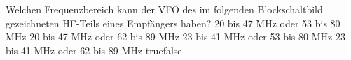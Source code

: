     {Welchen Frequenzbereich kann der VFO des im folgenden Blockschaltbild gezeichneten HF-Teils eines Empfängers haben?}
    {20 bis 47 MHz oder 53 bis 80 MHz}
    {20 bis 47 MHz oder 62 bis 89 MHz}
    {23 bis 41 MHz oder 53 bis 80 MHz}
    {23 bis 41 MHz oder 62 bis 89 MHz}
    {true}{false}